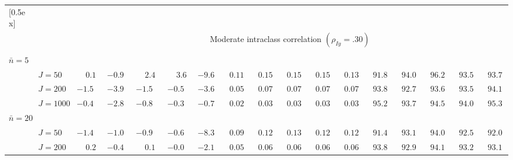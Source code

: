 \begin{sidewaystable}
\begin{threeparttable}
\begin{tabular}{llccccccccccccccc}
[0.5ex]\hline\\[-1.6ex] 
& & \multicolumn{15}{c}{Moderate intraclass correlation $(\rho_{Iy}=.30)$} \\[0.6ex]\hline\\[-1.8ex]
\multicolumn{4}{l}{$\bar{n}=5$} \\  & \nopagebreak $\;J=50$  & $\phantom{-}0.1\phantom{0}$ & ${-}0.9\phantom{0}$ & $\phantom{-}2.4\phantom{0}$ & $\phantom{-}3.6\phantom{0}$ & ${-}9.6\phantom{0}$ & $\phantom{0}0.11\phantom{0}$ & $\phantom{0}0.15\phantom{0}$ & $\phantom{0}0.15\phantom{0}$ & $\phantom{0}0.15\phantom{0}$ & $\phantom{0}0.13\phantom{0}$ & $\phantom{0}91.8\phantom{0}$ & $\phantom{0}94.0\phantom{0}$ & $\phantom{0}96.2\phantom{0}$ & $\phantom{0}93.5\phantom{0}$ & $\phantom{0}93.7\phantom{0}$ \\
 & \nopagebreak $\;J=200$  & ${-}1.5\phantom{0}$ & ${-}3.9\phantom{0}$ & ${-}1.5\phantom{0}$ & ${-}0.5\phantom{0}$ & ${-}3.6\phantom{0}$ & $\phantom{0}0.05\phantom{0}$ & $\phantom{0}0.07\phantom{0}$ & $\phantom{0}0.07\phantom{0}$ & $\phantom{0}0.07\phantom{0}$ & $\phantom{0}0.07\phantom{0}$ & $\phantom{0}93.8\phantom{0}$ & $\phantom{0}92.7\phantom{0}$ & $\phantom{0}93.6\phantom{0}$ & $\phantom{0}93.5\phantom{0}$ & $\phantom{0}94.1\phantom{0}$ \\
 & \nopagebreak $\;J=1000$  & ${-}0.4\phantom{0}$ & ${-}2.8\phantom{0}$ & ${-}0.8\phantom{0}$ & ${-}0.3\phantom{0}$ & ${-}0.7\phantom{0}$ & $\phantom{0}0.02\phantom{0}$ & $\phantom{0}0.03\phantom{0}$ & $\phantom{0}0.03\phantom{0}$ & $\phantom{0}0.03\phantom{0}$ & $\phantom{0}0.03\phantom{0}$ & $\phantom{0}95.2\phantom{0}$ & $\phantom{0}93.7\phantom{0}$ & $\phantom{0}94.5\phantom{0}$ & $\phantom{0}94.0\phantom{0}$ & $\phantom{0}95.3\phantom{0}$ \\
\multicolumn{4}{l}{$\bar{n}=20$} \\  & \nopagebreak $\;J=50$  & ${-}1.4\phantom{0}$ & ${-}1.0\phantom{0}$ & ${-}0.9\phantom{0}$ & ${-}0.6\phantom{0}$ & ${-}8.3\phantom{0}$ & $\phantom{0}0.09\phantom{0}$ & $\phantom{0}0.12\phantom{0}$ & $\phantom{0}0.13\phantom{0}$ & $\phantom{0}0.12\phantom{0}$ & $\phantom{0}0.12\phantom{0}$ & $\phantom{0}91.4\phantom{0}$ & $\phantom{0}93.1\phantom{0}$ & $\phantom{0}94.0\phantom{0}$ & $\phantom{0}92.5\phantom{0}$ & $\phantom{0}92.0\phantom{0}$ \\
 & \nopagebreak $\;J=200$  & $\phantom{-}0.2\phantom{0}$ & ${-}0.4\phantom{0}$ & $\phantom{-}0.1\phantom{0}$ & ${-}0.0\phantom{0}$ & ${-}2.1\phantom{0}$ & $\phantom{0}0.05\phantom{0}$ & $\phantom{0}0.06\phantom{0}$ & $\phantom{0}0.06\phantom{0}$ & $\phantom{0}0.06\phantom{0}$ & $\phantom{0}0.06\phantom{0}$ & $\phantom{0}93.8\phantom{0}$ & $\phantom{0}92.9\phantom{0}$ & $\phantom{0}94.1\phantom{0}$ & $\phantom{0}93.2\phantom{0}$ & $\phantom{0}93.1\phantom{0}$ \\

\end{tabular}
\end{threeparttable}
\end{sidewaystable}
